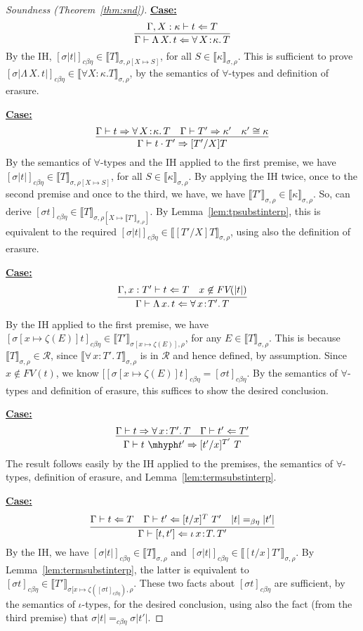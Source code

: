 \documentclass{article}
\newcommand{\choice}[0]{\zeta}
\newcommand{\abs}[4]{{#1}\, #2\! : \! #3.\, #4}
\newcommand{\absu}[3]{{#1}\, #2.\, #3}
\newcommand{\interp}[1]{\llbracket #1 \rrbracket}
\newcommand{\tpcheck}[0]{\Leftarrow}
\newcommand{\tpsynth}[0]{\Rightarrow}
\newcommand{\cbe}[0]{c\beta\eta}
\newcommand{\startcase}[1]{\vspace{#1} \noindent\textbf{\underline{Case:}}}
\begin{document}
\begin{proof}[Soundness (Theorem~\ref{thm:snd})]
\startcase{.2cm}
\[
    \infer{\Gamma\vdash \absu{\Lambda}{X}{t} \tpcheck \abs{\forall}{X}{\kappa}{T}}{\Gamma,X:\kappa\vdash t \tpcheck T} 
\]
By the IH, $[\sigma |t|]_{\cbe}\in\interp{T}_{\sigma,\rho[X\mapsto S]}$, for all $S\in\interp{\kappa}_{\sigma,\rho}$.
This is sufficient to prove $[\sigma |\absu{\Lambda}{X}{t}|]_{\cbe}\in\interp{\forall X:\kappa.T}_{\sigma,\rho}$, by the semantics
of $\forall$-types and definition of erasure.

\startcase{.2cm}
\[
    \infer{\Gamma\vdash t \cdot T' \tpsynth [T'/X]T}
    {\Gamma\vdash t \tpsynth \abs{\forall}{X}{\kappa}{T}
      & \Gamma\vdash T' \tpsynth \kappa'
      & \kappa' \cong \kappa
    } 
\]
By the semantics of $\forall$-types and the IH applied to the first
premise, we have $[\sigma |t|]_{\cbe}\in\interp{T}_{\sigma,\rho[X\mapsto
  S]}$, for all $S\in\interp{\kappa}_{\sigma,\rho}$.
By applying the IH twice, once to the second premise and once to the third, we
have, we have \(\interp{T'}_{\sigma,\rho} \in \interp{\kappa}_{\sigma,\rho}\).
So, can derive $[\sigma t]_{\cbe}\in\interp{T}_{\sigma,\rho[X\mapsto \interp{T'}_{\sigma,\rho}]}$.
By Lemma~\ref{lem:tpsubstinterp},
this is equivalent to the required $[\sigma |t|]_{\cbe}\in\interp{[T'/X]T}_{\sigma,\rho}$,
using also the definition of erasure.

\startcase{.2cm}
\[
    \infer{\Gamma\vdash \absu{\Lambda}{x}{t} \tpcheck \abs{\forall}{x}{T'}{T}}{\Gamma,x:T'\vdash t \tpcheck T & x\not\in\textit{FV}(|t|)} 
\]

By the IH applied to the first premise, we have
$[\sigma[x\mapsto\choice(E)]
t]_{\cbe}\in\interp{T'}_{\sigma[x\mapsto\choice(E)],\rho}$, for any
$E\in\interp{T}_{\sigma,\rho}$.  This is because
$\interp{T}_{\sigma,\rho}\in\mathcal{R}$, since $\interp{\abs{\forall}{x}{T'}{T}}_{\sigma,\rho}$ is in $\mathcal{R}$ and
hence defined, by assumption.  Since $x\not\in\textit{FV}(t)$, we know
$[[\sigma[x\mapsto\choice(E)]t]_{\cbe} = [\sigma t]_{\cbe}$.  By the
semantics of $\forall$-types and definition of erasure, this suffices to show the desired
conclusion.

\startcase{.2cm}
\[
    \infer{\Gamma\vdash t\ \mhyph t' \tpsynth [t'/x]^{T'}\ T}{\Gamma\vdash t \tpsynth \abs{\forall}{x}{T'}{T} & \Gamma\vdash t' \tpcheck T'}
\]
The result follows easily by the IH applied to the premises, the
semantics of $\forall$-types, definition of erasure, and Lemma~\ref{lem:termsubstinterp}.


\startcase{.2cm}
\[
    \infer{\Gamma\vdash [ t , t' ] \tpcheck \abs{\iota}{x}{T}{T'}}
          {\Gamma\vdash t \tpcheck T & \Gamma\vdash t' \tpcheck [t/x]^{T}\ T' & |t| =_{\beta\eta} |t'|} 
\]
By the IH, we have $[\sigma |t|]_{\cbe}\in\interp{T}_{\sigma,\rho}$ and
$[\sigma |t|]_{\cbe}\in\interp{[t/x]T'}_{\sigma,\rho}$.  By
Lemma~\ref{lem:termsubstinterp}, the latter is equivalent to
$[\sigma t]_{\cbe}\in\interp{T'}_{\sigma[x\mapsto\choice([\sigma t]_{\cbe}),\rho}$.  These two facts about $[\sigma t]_{\cbe}$ are
sufficient, by the semantics of $\iota$-types, for the desired
conclusion, using also the fact (from the third premise) that $\sigma|t| =_{\cbe} \sigma|t'|$.


\end{proof}
\end{document}
